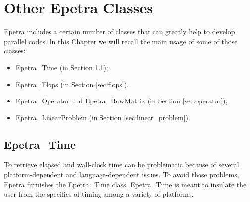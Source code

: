 % 
% 
% 
%   
%   
% 
% 

\section{Other Epetra Classes}
\label{chap:epetra_others}

Epetra includes a certain number of classes that can greatly help to
develop parallel codes. In this Chapter we will recall the main
usage of some of those classes:
\begin{itemize}
\item Epetra\_Time (in Section \ref{sec:time});
\item Epetra\_Flops (in Section \ref{sec:flops}).
\item Epetra\_Operator and Epetra\_RowMatrix (in Section \ref{sec:operator});
\item Epetra\_LinearProblem (in Section \ref{sec:linear_problem}).
\end{itemize}


\subsection{Epetra\_Time}
\label{sec:time}

To retrieve elapsed and wall-clock time can be problematic because of
several platform-dependent and language-dependent issues. To avoid those
problems, Epetra furnishes the Epetra\_Time class.  Epetra\_Time is
meant to insulate the user from the specifics of timing among a variety
of platforms.


